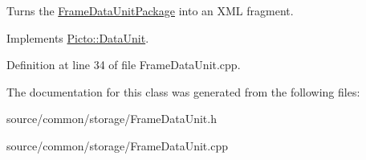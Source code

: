 Turns the \hyperlink{class_picto_1_1_frame_data_unit_package}{Frame\-Data\-Unit\-Package} into an X\-M\-L fragment. 



Implements \hyperlink{class_picto_1_1_data_unit_a72923bddebee1127470ef9e8face7d3a}{Picto\-::\-Data\-Unit}.



Definition at line 34 of file Frame\-Data\-Unit.\-cpp.



The documentation for this class was generated from the following files\-:\begin{DoxyCompactItemize}
\item 
source/common/storage/Frame\-Data\-Unit.\-h\item 
source/common/storage/Frame\-Data\-Unit.\-cpp\end{DoxyCompactItemize}
